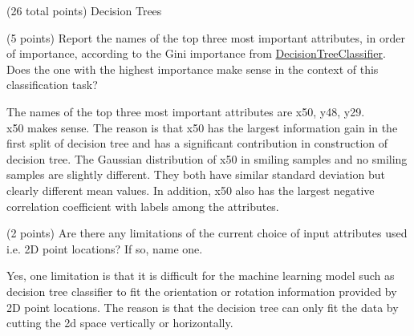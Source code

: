 \documentclass[12pt]{article}
\begin{document}
\begin{question}{(26 total points) Decision Trees}
\begin{subquestion}
\end{subquestion}


%
%
\begin{subquestion}{(5 points) 
Report the names of the top three most important attributes, in order of importance, according to the Gini importance from \href{https://scikit-learn.org/0.19/modules/generated/sklearn.tree.DecisionTreeClassifier.html}{DecisionTreeClassifier}. 
Does the one with the highest importance make sense in the context of this classification task? \\
}


\begin{answerbox}{10em}
The names of the top three most important attributes are x50, y48, y29.\\
x50 makes sense. The reason is that x50 has the largest information gain in the first split of decision tree and has a significant contribution in construction of decision tree. The Gaussian distribution of x50 in smiling samples and no smiling samples are slightly different. They both have similar standard deviation but clearly different mean values. In addition, x50 also has the largest negative correlation coefficient with labels among the attributes.
\end{answerbox}



\end{subquestion}



%
%
\begin{subquestion}{(2 points) 
Are there any limitations of the current choice of input attributes used i.e. 2D point locations? If so, name one. 
}


\begin{answerbox}{10em}
Yes, one limitation is that it is difficult for the machine learning model such as decision tree classifier to fit the orientation or rotation information provided by 2D point locations. The reason is that the decision tree can only fit the data by cutting the 2d space vertically or horizontally.
\end{answerbox}



\end{subquestion}


\end{question}
\end{document}
